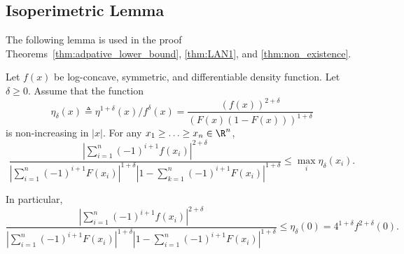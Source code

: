 \subsection{Isoperimetric Lemma
\label{sec:bound_intervals_delta} }
The following lemma is used in the proof Theorems~\ref{thm:adpative_lower_bound}, \ref{thm:LAN1}, and \ref{thm:non_existence}. 

\begin{lem} \label{lem:bound_intervals_delta}
Let $f(x)$ be log-concave, symmetric, and differentiable density function. Let $\delta\geq 0$. Assume that the function
\[
\eta_\delta(x) \triangleq  \eta^{1+\delta}(x)/f^\delta(x) = \frac{  \left( f(x) \right)^{2+\delta}}{\left(F(x)(1-F(x))\right)^{1+\delta}}
\]
is non-increasing in $|x|$. For any $x_1 \ge \ldots \ge x_n \in \R^n$,
\begin{equation}
\frac{ \left| \sum_{i=1}^n (-1)^{i+1} f(x_i) \right|^{2+\delta} }
{\left| \sum_{i=1}^n (-1)^{i+1} F(x_i) \right|^{1+\delta} \left|1- \sum_{k=1}^n (-1)^{i+1} F(x_i) \right|^{1+\delta} } 
\leq  \max_{i} \eta_\delta(x_i).
\label{eq:lem_bound_intervals_delta}
\end{equation}
\end{lem}
In particular, 
\[
\frac{ \left| \sum_{i=1}^n (-1)^{i+1} f(x_i) \right|^{2+\delta} }
{\left| \sum_{i=1}^n (-1)^{i+1} F(x_i) \right|^{1+\delta} \left|1- \sum_{i=1}^n (-1)^{i+1} F(x_i) \right|^{1+\delta} } 
\leq \eta_\delta(0) = 4^{1+\delta} f^{2+\delta}(0).
\]

